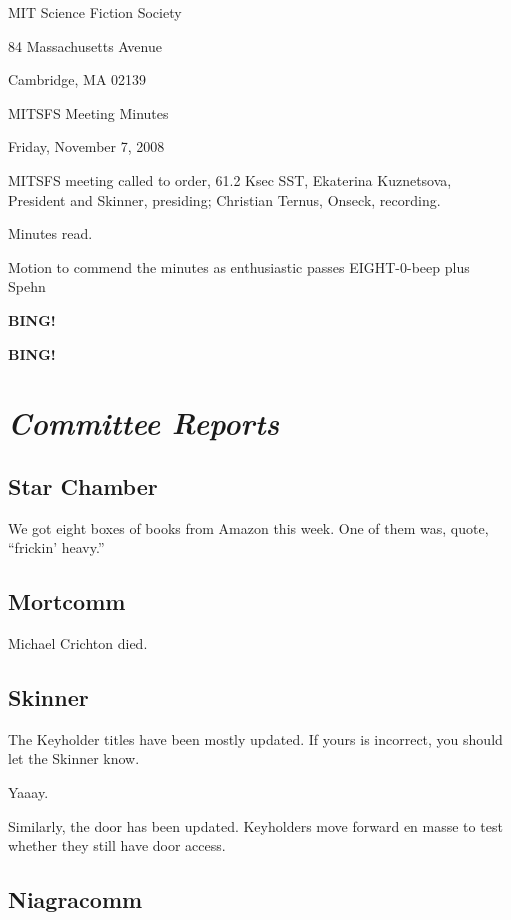 \documentclass[10pt]{article}
\newcommand{\bing}{{\bf BING!} }
\newcommand{\goto}[1]{\bing \vskip 12pt \section*{{\em{#1}}}}
\newcommand{\ps}{ plus Spehn\xspace}
\begin{document}
\begin{center}

MIT Science Fiction Society

84 Massachusetts Avenue

Cambridge, MA 02139

\vspace{12pt}

MITSFS Meeting Minutes

Friday, November 7, 2008

\end{center}

\vspace{18pt}

\setlength{\parskip}{6pt}

\noindent
MITSFS meeting called to order, 61.2 Ksec SST,
Ekaterina Kuznetsova, President and Skinner, presiding; Christian Ternus, Onseck, recording.

Minutes read.

Motion to commend the minutes as enthusiastic passes EIGHT-0-beep \ps

\bing

\goto{Committee Reports}

\subsection*{Star Chamber}

We got eight boxes of books from Amazon this week.  One of them was,
quote, ``frickin' heavy.''

\subsection*{Mortcomm}

Michael Crichton died.

\subsection*{Skinner}

The Keyholder titles have been mostly updated.  If yours is incorrect,
you should let the Skinner know.

Yaaay.

Similarly, the door has been updated.  Keyholders move forward en
masse to test whether they still have door access.

\subsection*{Niagracomm}
\end{document}
